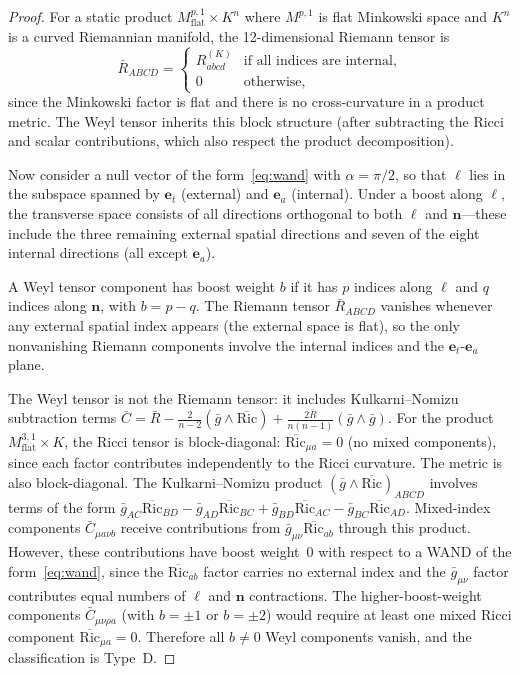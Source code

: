 \documentclass[12pt]{article}
\theoremstyle{definition}
\theoremstyle{remark}
\begin{document}
\begin{proof}
For a static product $M^{p,1}_{\mathrm{flat}}\times K^n$ where $M^{p,1}$ is flat Minkowski space and $K^n$ is a curved Riemannian manifold, the 12-dimensional Riemann tensor is
\begin{equation}
\bar{R}_{ABCD} = \begin{cases}
R_{abcd}^{(K)} & \text{if all indices are internal}, \\
0 & \text{otherwise},
\end{cases}
\end{equation}
since the Minkowski factor is flat and there is no cross-curvature in a product metric.  The Weyl tensor inherits this block structure (after subtracting the Ricci and scalar contributions, which also respect the product decomposition).

Now consider a null vector of the form~\eqref{eq:wand} with $\alpha=\pi/2$, so that $\boldsymbol{\ell}$ lies in the subspace spanned by $\boldsymbol{e}_t$ (external) and $\boldsymbol{e}_a$ (internal).  Under a boost along $\boldsymbol{\ell}$, the transverse space consists of all directions orthogonal to both $\boldsymbol{\ell}$ and $\boldsymbol{n}$---these include the three remaining external spatial directions and seven of the eight internal directions (all except $\boldsymbol{e}_a$).

A Weyl tensor component has boost weight $b$ if it has $p$ indices along $\boldsymbol{\ell}$ and $q$ indices along $\boldsymbol{n}$, with $b=p-q$.  The Riemann tensor $\bar{R}_{ABCD}$ vanishes whenever any external spatial index appears (the external space is flat), so the only nonvanishing Riemann components involve the internal indices and the $\boldsymbol{e}_t$-$\boldsymbol{e}_a$ plane.

The Weyl tensor is not the Riemann tensor: it includes Kulkarni--Nomizu subtraction terms $\bar{C}=\bar{R}-\frac{2}{n-2}(\bar{g}\wedge\overline{\mathrm{Ric}})+\frac{2\bar{R}}{n(n-1)}(\bar{g}\wedge\bar{g})$.  For the product $M^{3,1}_{\mathrm{flat}}\times K$, the Ricci tensor is block-diagonal: $\overline{\mathrm{Ric}}_{\mu a}=0$ (no mixed components), since each factor contributes independently to the Ricci curvature.  The metric is also block-diagonal.  The Kulkarni--Nomizu product $(\bar{g}\wedge\overline{\mathrm{Ric}})_{ABCD}$ involves terms of the form $\bar{g}_{AC}\overline{\mathrm{Ric}}_{BD}-\bar{g}_{AD}\overline{\mathrm{Ric}}_{BC}+\bar{g}_{BD}\overline{\mathrm{Ric}}_{AC}-\bar{g}_{BC}\overline{\mathrm{Ric}}_{AD}$.  Mixed-index components $\bar{C}_{\mu a \nu b}$ receive contributions from $\bar{g}_{\mu\nu}\overline{\mathrm{Ric}}_{ab}$ through this product.  However, these contributions have boost weight~0 with respect to a WAND of the form~\eqref{eq:wand}, since the $\overline{\mathrm{Ric}}_{ab}$ factor carries no external index and the $\bar{g}_{\mu\nu}$ factor contributes equal numbers of $\boldsymbol{\ell}$ and $\boldsymbol{n}$ contractions.  The higher-boost-weight components $\bar{C}_{\mu\nu\rho a}$ (with $b=\pm1$ or $b=\pm2$) would require at least one mixed Ricci component $\overline{\mathrm{Ric}}_{\mu a}=0$.  Therefore all $b\neq 0$ Weyl components vanish, and the classification is Type~D.
\end{proof}
\end{document}
